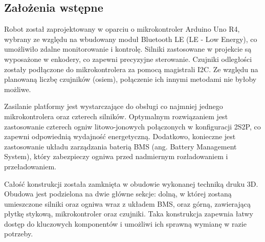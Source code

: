\documentclass{report}
\begin{document}
\subsection{\Large Założenia wstępne}
Robot został zaprojektowany w oparciu o mikrokontroler Arduino Uno R4, wybrany ze względu na wbudowany moduł Bluetooth LE (LE - Low Energy), co umożliwiło zdalne monitorowanie i kontrolę. Silniki zastosowane w projekcie są wyposażone w enkodery, co zapewni precyzyjne sterowanie. Czujniki odległości zostały podłączone do mikrokontrolera za pomocą magistrali I2C. Ze względu na planowaną liczbę czujników (osiem), połączenie ich innymi metodami nie byłoby możliwe.

Zasilanie platformy jest wystarczające do obsługi co najmniej jednego mikrokontrolera oraz czterech silników. Optymalnym rozwiązaniem jest zastosowanie czterech ogniw litowo-jonowych połączonych w konfiguracji 2S2P, co zapewni odpowiednią wydajność energetyczną. Dodatkowo, konieczne jest zastosowanie układu zarządzania baterią BMS (ang. Battery Management System), który zabezpieczy ogniwa przed nadmiernym rozładowaniem i przeładowaniem.

Całość konstrukcji została zamknięta w obudowie wykonanej techniką druku 3D. Obudowa jest podzielona na dwie główne sekcje: dolną, w której zostaną umieszczone silniki oraz ogniwa wraz z układem BMS, oraz górną, zawierającą płytkę stykową, mikrokontroler oraz czujniki. Taka konstrukcja zapewnia łatwy dostęp do kluczowych komponentów i umożliwi ich sprawną wymianę w razie potrzeby.

\end{document}

